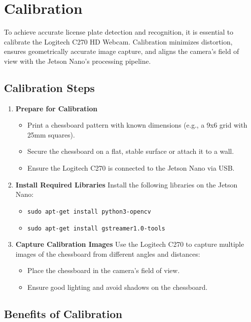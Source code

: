 \section{Calibration}

To achieve accurate license plate detection and recognition, it is essential to calibrate the Logitech C270 HD Webcam. Calibration minimizes distortion, ensures geometrically accurate image capture, and aligns the camera's field of view with the Jetson Nano's processing pipeline.

\subsection{Calibration Steps}

\begin{enumerate}
	\item \textbf{Prepare for Calibration}
	\begin{itemize}
		\item Print a chessboard pattern with known dimensions (e.g., a 9x6 grid with 25mm squares).
		\item Secure the chessboard on a flat, stable surface or attach it to a wall.
		\item Ensure the Logitech C270 is connected to the Jetson Nano via USB.
	\end{itemize}
	
	\item \textbf{Install Required Libraries}
	Install the following libraries on the Jetson Nano:
	\begin{itemize}
		\item \texttt{sudo apt-get install python3-opencv}
		\item \texttt{sudo apt-get install gstreamer1.0-tools}
	\end{itemize}
	
	\item \textbf{Capture Calibration Images}
	Use the Logitech C270 to capture multiple images of the chessboard from different angles and distances:
	\begin{itemize}
		\item Place the chessboard in the camera's field of view.
		\item Ensure good lighting and avoid shadows on the chessboard.
	\end{itemize}
\end{enumerate}

\subsection{Benefits of Calibration}

